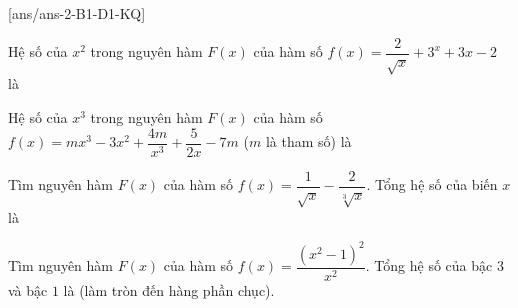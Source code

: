 [ans/ans-2-B1-D1-KQ]
\begin{ex}%
	Hệ số của $x^2$ trong nguyên hàm $F(x)$ của hàm số $f(x)=\dfrac{2}{\sqrt{x}}+3^x+3x-2$ là
\end{ex}

\begin{ex}%
	Hệ số của $x^3$ trong nguyên hàm $F(x)$ của hàm số $f(x)=m{x^3}-3x^2+\dfrac{4m}{x^3}+\dfrac{5}{2x}-7m$ ($m$ là tham số) là
\end{ex}

\begin{ex}%
	Tìm nguyên hàm $F(x)$ của hàm số $f(x)=\dfrac{1}{\sqrt{x}}-\dfrac{2}{\sqrt[3]{x}}$. Tổng hệ số của biến $x$ là
\end{ex}

\begin{ex}%
	Tìm nguyên hàm $F(x)$ của hàm số $f(x)=\dfrac{(x^2-1)^2}{x^2}$. Tổng hệ số của bậc $3$ và bậc $1$ là (làm tròn đến hàng phần chục).
\end{ex}


